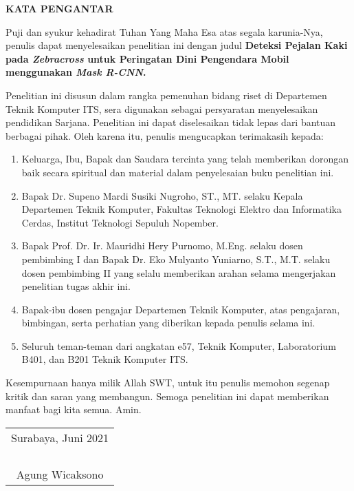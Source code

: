 \begin{center}
  \Large
  \textbf{KATA PENGANTAR}
\end{center}

\vspace{1ex}


\setlength{\parindent}{0.9cm} Puji dan syukur kehadirat Tuhan Yang Maha Esa atas segala karunia-Nya, penulis  dapat menyelesaikan penelitian ini dengan judul \textbf{Deteksi Pejalan Kaki pada \textit{Zebracross} untuk Peringatan Dini Pengendara Mobil menggunakan \textit{Mask R-CNN}.}

Penelitian ini disusun dalam rangka pemenuhan bidang riset di Departemen Teknik Komputer ITS, sera digunakan sebagai persyaratan menyelesaikan pendidikan Sarjana. Penelitian ini dapat diselesaikan tidak lepas dari bantuan berbagai pihak. Oleh karena itu, penulis mengucapkan terimakasih kepada:

\begin{enumerate}[nolistsep]
  \item Keluarga, Ibu, Bapak dan Saudara tercinta yang telah memberikan dorongan baik secara spiritual dan material dalam penyelesaian buku penelitian ini.
  \item Bapak Dr. Supeno Mardi Susiki Nugroho, ST., MT. selaku Kepala Departemen Teknik Komputer, Fakultas Teknologi Elektro dan Informatika Cerdas, Institut Teknologi Sepuluh Nopember. 
  \item Bapak Prof. Dr. Ir. Mauridhi Hery Purnomo, M.Eng. selaku dosen pembimbing I dan Bapak Dr. Eko Mulyanto Yuniarno, S.T., M.T. selaku dosen pembimbing II yang selalu memberikan arahan selama mengerjakan penelitian tugas akhir ini.
  \item Bapak-ibu dosen pengajar Departemen Teknik Komputer, atas pengajaran, bimbingan, serta perhatian yang diberikan kepada penulis selama ini.
  \item Seluruh teman-teman dari angkatan e57, Teknik Komputer, Laboratorium B401, dan B201 Teknik Komputer ITS.
\end{enumerate}

Kesempurnaan hanya milik Allah SWT, untuk itu penulis memohon segenap kritik dan saran yang membangun. Semoga penelitian ini dapat memberikan manfaat bagi kita semua. Amin.


\begin{flushright}
  \begin{tabular}[b]{c}
    Surabaya, Juni 2021\\
    \\
    \\
    \\
    \\
    Agung Wicaksono
  \end{tabular}
\end{flushright}
